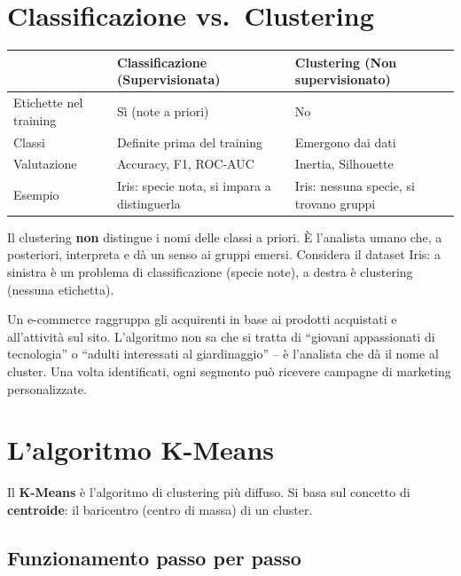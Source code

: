 \section{Classificazione vs.\ Clustering}

\begin{center}
\renewcommand{\arraystretch}{1.3}
\begin{tabular}{@{} l p{6.5cm} p{6.5cm} @{}}
\toprule
& \textbf{Classificazione (Supervisionata)} & \textbf{Clustering (Non supervisionato)} \\
\midrule
Etichette nel training & Sì (note a priori) & No \\
Classi & Definite prima del training & Emergono dai dati \\
Valutazione & Accuracy, F1, ROC-AUC & Inertia, Silhouette \\
Esempio & Iris: specie nota, si impara a distinguerla & Iris: nessuna specie, si trovano gruppi \\
\bottomrule
\end{tabular}
\end{center}

Il clustering \textbf{non} distingue i nomi delle classi a priori. È l'analista umano che, a posteriori, interpreta e dà un senso ai gruppi emersi. Considera il dataset Iris: a sinistra è un problema di classificazione (specie note), a destra è clustering (nessuna etichetta).

\begin{exbox}
Un e-commerce raggruppa gli acquirenti in base ai prodotti acquistati e all'attività sul sito. L'algoritmo non sa che si tratta di ``giovani appassionati di tecnologia'' o ``adulti interessati al giardinaggio'' -- è l'analista che dà il nome al cluster. Una volta identificati, ogni segmento può ricevere campagne di marketing personalizzate.
\end{exbox}

\section{L'algoritmo K-Means}

Il \textbf{K-Means} è l'algoritmo di clustering più diffuso. Si basa sul concetto di \textbf{centroide}: il baricentro (centro di massa) di un cluster.

\subsection{Funzionamento passo per passo}

